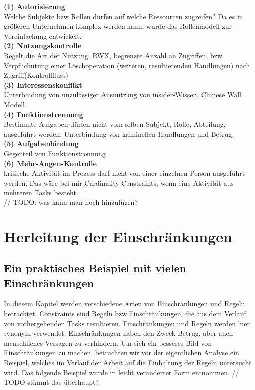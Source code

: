\textbf{(1) Autorisierung}\\
Welche Subjekte bzw Rollen dürfen auf welche Ressourcen zugreifen? Da es in größeren Unternehmen komplex werden kann, wurde das Rollenmodell zur Vereinfachung entwickelt. \\
\textbf{(2) Nutzungskontrolle}\\
Regelt die Art der Nutzung. RWX, begrenzte Anzahl an Zugriffen, bzw Verpflichutung einer Löschoperation (weiteren, resultierenden Handlungen) nach Zugriff(Kontrollfluss)\\
\textbf{(3) Interessenskonflikt}\\
Unterbindung von unzulässiger Ausnutzung von insider-Wissen. Chinese Wall Modell.\\
\textbf{(4) Funktionstrennung}\\
Bestimmte Aufgaben dürfen nicht vom selben Subjekt, Rolle, Abteilung, ausgeführt werden. Unterbindung von kriminellen Handlungen und Betrug.\\
\textbf{(5) Aufgabenbindung}\\
Gegenteil von Funktionstrennung\\
\textbf{(6) Mehr-Augen-Kontrolle}\\
kritische Aktivität im Prozess darf nicht von einer einzelnen Person ausgeführt werden. Das wäre bei mir Cardinality Constraints, wenn eine Aktivität aus mehreren Tasks besteht.\\

// TODO: was kann man noch hinzufügen?



\section{Herleitung der Einschränkungen}



\subsection{Ein praktisches Beispiel mit vielen Einschränkungen}
\label{sec:exampleconstraints}

In diesem Kapitel werden verschiedene Arten von Einschränlungen und Regeln betrachtet.
Constraints sind Regeln bzw Einschränkungen, die aus dem Verlauf von vorhergehenden Tasks resultieren. Einschränkungen und Regeln werden hier synonym verwendet.
Einschränkungen haben den Zweck Betrug, aber auch menschliches Versagen zu verhindern.
Um sich ein besseres Bild von Einschränkungen zu machen, betrachten wir vor der eigentlichen Analyse ein Beispiel, welches im Verlauf der Arbeit auf die Einhaltung der Regeln untersucht wird.
Das folgende Beispiel wurde in leicht veränderter Form \cite{wolter_modeling_of_TBAC_in_BPMN} entnommen. // TODO stimmt das überhaupt?

